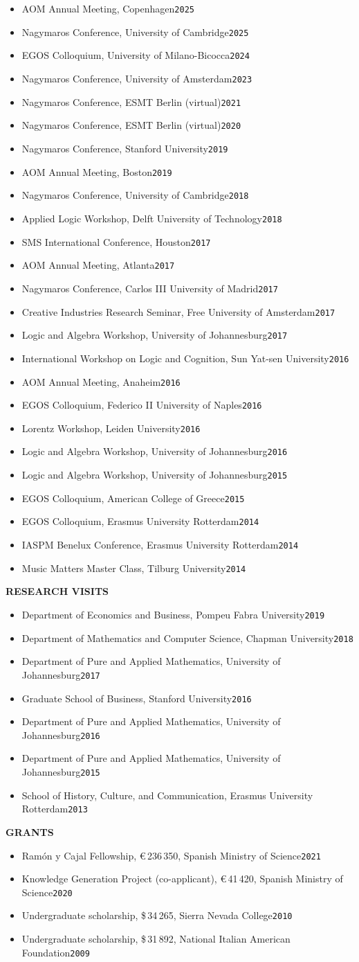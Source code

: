 \documentclass[a4paper]{article}
\newenvironment{cvlines}{\begin{itemize}[nosep,leftmargin=1em]}{\end{itemize}}
\newcommand\cvsection[1]{\textbf{\uppercase{#1}}\hspace{.5em}\hrulefill\par}
\newcommand\cvline[4][,]{\item[\textperiodcentered] {#2#1 #3\hfill{\texttt{#4}}}}
\begin{document}
\begin{cvlines}
  \cvline{AOM Annual Meeting}{Copenhagen}{2025}
  \cvline{Nagymaros Conference}{University of Cambridge}{2025}
  \cvline{EGOS Colloquium}{University of Milano-Bicocca}{2024}
  \cvline{Nagymaros Conference}{University of Amsterdam}{2023}
  \cvline{Nagymaros Conference}{ESMT Berlin (virtual)}{2021}
  \cvline{Nagymaros Conference}{ESMT Berlin (virtual)}{2020}
  \cvline{Nagymaros Conference}{Stanford University}{2019}
  \cvline{AOM Annual Meeting}{Boston}{2019}
  \cvline{Nagymaros Conference}{University of Cambridge}{2018}
  \cvline{Applied Logic Workshop}{Delft University of Technology}{2018}
  \cvline{SMS International Conference}{Houston}{2017}
  \cvline{AOM Annual Meeting}{Atlanta}{2017}
  \cvline{Nagymaros Conference}{Carlos III University of Madrid}{2017}
  \cvline{Creative Industries Research Seminar}{Free University of Amsterdam}{2017}
  \cvline{Logic and Algebra Workshop}{University of Johannesburg}{2017}
  \cvline{International Workshop on Logic and Cognition}{Sun Yat-sen University}{2016}
  \cvline{AOM Annual Meeting}{Anaheim}{2016}
  \cvline{EGOS Colloquium}{Federico II University of Naples}{2016}
  \cvline{Lorentz Workshop}{Leiden University}{2016}
  \cvline{Logic and Algebra Workshop}{University of Johannesburg}{2016}
  \cvline{Logic and Algebra Workshop}{University of Johannesburg}{2015}
  \cvline{EGOS Colloquium}{American College of Greece}{2015}
  \cvline{EGOS Colloquium}{Erasmus University Rotterdam}{2014}
  \cvline{IASPM Benelux Conference}{Erasmus University Rotterdam}{2014}
  \cvline{Music Matters Master Class}{Tilburg University}{2014}
\end{cvlines}
\bigskip
\cvsection{Research visits}
\smallskip
\begin{cvlines}
  \cvline{Department of Economics and Business}{Pompeu Fabra University}{2019}
  \cvline{Department of Mathematics and Computer Science}{Chapman University}{2018}
  \cvline{Department of Pure and Applied Mathematics}{University of Johannesburg}{2017}
  \cvline{Graduate School of Business}{Stanford University}{2016}
  \cvline{Department of Pure and Applied Mathematics}{University of Johannesburg}{2016}
  \cvline{Department of Pure and Applied Mathematics}{University of Johannesburg}{2015}
  \cvline{School of History, Culture, and Communication}{Erasmus University Rotterdam}{2013}
\end{cvlines}
\bigskip
\cvsection{Grants}
\smallskip
\begin{cvlines}
  \cvline{Ramón y Cajal Fellowship, €\,236\,350}{Spanish Ministry of Science}{2021}
  \cvline{Knowledge Generation Project (co-applicant), €\,41\,420}{Spanish Ministry of Science}{2020}
  \cvline{Undergraduate scholarship, \$\,34\,265}{Sierra Nevada College}{2010}
  \cvline{Undergraduate scholarship, \$\,31\,892}{National Italian American Foundation}{2009}
\end{cvlines}
\end{document}
